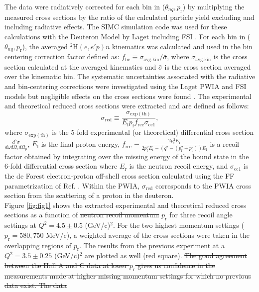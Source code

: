 \documentclass[aps,prl,twocolumn,showpacs,superscriptaddress,groupedaddress]{revtex4-2}  %
\providecommand{\DIFaddtex}[1]{{\protect\color{blue}\uwave{#1}}} %
\providecommand{\DIFdeltex}[1]{{\protect\color{red}\sout{#1}}}                      %
\providecommand{\DIFaddbegin}{} %
\providecommand{\DIFaddend}{} %
\providecommand{\DIFdelbegin}{} %
\providecommand{\DIFdelend}{} %
\providecommand{\DIFadd}[1]{\texorpdfstring{\DIFaddtex{#1}}{#1}} %
\providecommand{\DIFdel}[1]{\texorpdfstring{\DIFdeltex{#1}}{}} %
\newcommand{\DIFscaledelfig}{0.5}
\newlength{\DIFdelgraphicswidth} %
\newlength{\DIFdelgraphicsheight} %
\newcommand{\DIFaddincludegraphics}[2][]{{\color{blue}\fbox{\DIFOincludegraphics[#1]{#2}}}} %
\newcommand{\DIFdelincludegraphics}[2][]{%
\sbox{\DIFdelgraphicsbox}{\DIFOincludegraphics[#1]{#2}}%
\settoboxwidth{\DIFdelgraphicswidth}{\DIFdelgraphicsbox} %
\settoboxtotalheight{\DIFdelgraphicsheight}{\DIFdelgraphicsbox} %
\scalebox{\DIFscaledelfig}{%
\parbox[b]{\DIFdelgraphicswidth}{\usebox{\DIFdelgraphicsbox}\\[-\baselineskip] \rule{\DIFdelgraphicswidth}{0em}}\llap{\resizebox{\DIFdelgraphicswidth}{\DIFdelgraphicsheight}{%
\setlength{\unitlength}{\DIFdelgraphicswidth}%
\begin{picture}(1,1)%
\thicklines\linethickness{2pt} %
{\color[rgb]{1,0,0}\put(0,0){\framebox(1,1){}}}%
{\color[rgb]{1,0,0}\put(0,0){\line( 1,1){1}}}%
{\color[rgb]{1,0,0}\put(0,1){\line(1,-1){1}}}%
\end{picture}%
}\hspace*{3pt}}} %
} %
\DeclareRobustCommand{\DIFaddbegin}{\DIFOaddbegin \let\includegraphics\DIFaddincludegraphics} %
\DeclareRobustCommand{\DIFaddend}{\DIFOaddend \let\includegraphics\DIFOincludegraphics} %
\DeclareRobustCommand{\DIFdelbegin}{\DIFOdelbegin \let\includegraphics\DIFdelincludegraphics} %
\DeclareRobustCommand{\DIFdelend}{\DIFOaddend \let\includegraphics\DIFOincludegraphics} %
\begin{document}
\indent The data were radiatively corrected for each bin in ($\theta_{nq}, p_{\mathrm{r}}$) by multiplying the measured cross sections by the ratio of the calculated particle yield excluding and including radiative effects.
The SIMC simulation code was used for these calculations with the Deuteron Model by Laget including FSI \cite{LAGET2005}.
For each bin in ($\theta_{nq}, p_{\mathrm{r}}$), the averaged $^{2}\mathrm{H}(e,e'p)n$ kinematics was calculated and used in the bin centering correction factor defined as:
$f_{\mathrm{bc}} \equiv \sigma_{\mathrm{avg.kin}} / \bar{\sigma}$, where $\sigma_{\mathrm{avg.kin}}$ is the cross section calculated at the averaged kinematics and $\bar{\sigma}$ is the cross section averaged
over the kinematic bin. The systematic uncertainties associated with the radiative and bin-centering corrections were investigated using the Laget PWIA and FSI models but negligible effects on the cross sections were found \DIFaddbegin \DIFadd{(see Supplemental Material)}\DIFaddend .
The experimental and theoretical reduced cross sections were extracted and are defined as follows:
\begin{equation}
\sigma_{\mathrm{red}} \equiv \frac{\sigma_{\mathrm{exp(th)}}}{E_{\mathrm{f}}p_{\mathrm{f}}f_{\mathrm{rec}}\sigma_{\mathrm{cc1}}},
\label{eq:1}
\end{equation}
\noindent where $\sigma_{\mathrm{exp(th)}}$ is the 5-fold experimental (or theoretical) differential cross section $\frac{d^{5}\sigma}{d\omega d\Omega_{e} d\Omega_{p}}$,
$E_{\mathrm{f}}$ is the final proton energy, $f_{\mathrm{rec}}\equiv \frac{2p_{\mathrm{f}}^{2}E_{\mathrm{r}}}{2p_{\mathrm{f}}^{2}E_{\mathrm{r}} - (q^{2} - (p_{\mathrm{f}}^{2} + p_{\mathrm{r}}^{2}))E_{\mathrm{f}}}$
is a recoil factor obtained by integrating over the missing energy of the bound state in the 6-fold differential cross section where $E_{\mathrm{r}}$ is the neutron recoil energy, and $\sigma_{\mathrm{cc1}}$ is the
de Forest \cite{DEFOREST1983} electron-proton off-shell cross section calculated using the FF parametrization of Ref. \cite{PhysRevC.69.022201}.
Within the PWIA, $\sigma_{\mathrm{red}}$ corresponds to the PWIA cross section from the scattering of a proton in the deuteron. \\
\indent Figure \ref{fig:fig1} shows the extracted experimental and theoretical reduced cross sections as a function of \DIFdelbegin \DIFdel{neutron recoil momentum
}\DIFdelend $p_{\mathrm{r}}$ for three recoil angle settings at $Q^{2}=4.5\pm0.5$ (GeV/c)$^{2}$.
For the two highest momentum settings ($p_{\mathrm{r}}=580, 750$ MeV/c), a weighted average of the cross sections were taken in the overlapping regions of $p_{\mathrm{r}}$. The results from the previous experiment \cite{PhysRevLett.107.262501} at a $Q^{2}=3.5\pm0.25$ (GeV/c)$^{2}$ are plotted as well (red square). \DIFdelbegin \DIFdel{The good agreement between the Hall A and C data at lower $p_{\mathrm{r}}$
gives us confidence in the measurements made at higher missing momentum settings for which no previous data exist. The data }\DIFdelend %
\end{document}
